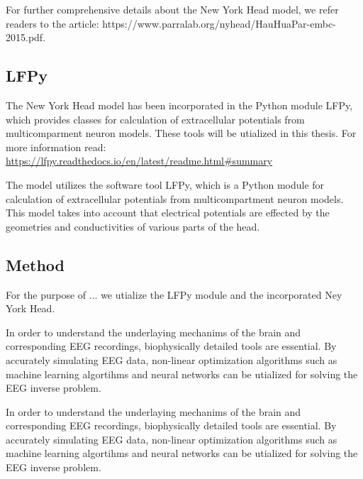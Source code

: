 \documentclass[a4paper, UKenglish, 11pt]{uiomaster}
\begin{document}
For further comprehensive details about the New York Head model, we refer readers to the article: https://www.parralab.org/nyhead/HauHuaPar-embc-2015.pdf.


\subsection{LFPy}


The New York Head model has been incorporated in the Python module LFPy, which provides classes for calculation of extracellular potentials from multicomparment neuron models. These tools will be utialized in this thesis. For more information read: \url{https://lfpy.readthedocs.io/en/latest/readme.html#summary}

The model utilizes the software tool LFPy, which is a Python module for calculation of extracellular potentials from multicompartment neuron models. This model takes into account that electrical potentials are effected by the geometries and conductivities of various parts of the head.

\subsection{Method}
For the purpose of ... we utialize the LFPy module and the incorporated Ney York Head.


In order to understand the underlaying mechanims of the brain and corresponding EEG recordings, biophysically detailed tools are essential. By accurately simulating EEG data,  non-linear optimization algorithms such as machine learning algortihms and neural networks can be utialized for solving the EEG inverse problem.



In order to understand the underlaying mechanims of the brain and corresponding EEG recordings, biophysically detailed tools are essential. By accurately simulating EEG data,  non-linear optimization algorithms such as machine learning algortihms and neural networks can be utialized for solving the EEG inverse problem.






\end{document}
